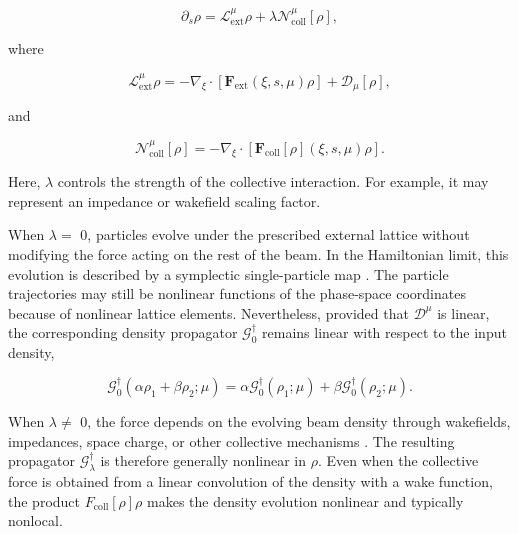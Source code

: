 \begin{equation}
\label{eq:87}
\partial_s\rho=\mathcal L_{\mathrm{ext}}^{\mu}\rho+\lambda\mathcal N_{\mathrm{coll}}^{\mu}[\rho],
\end{equation}

where

\begin{equation}
\label{eq:88}
\mathcal L_{\mathrm{ext}}^{\mu}\rho=-\nabla_{\xi}\cdot[\mathbf F_{\mathrm{ext}}(\xi,s,\mu)\rho]+\mathcal D_{\mu}[\rho],
\end{equation}

and

\begin{equation}
\label{eq:89}
\mathcal N_{\mathrm{coll}}^{\mu}[\rho]=-\nabla_{\xi}\cdot[\mathbf F_{\mathrm{coll}}[\rho](\xi,s,\mu)\rho].
\end{equation}

Here, \(\lambda\) controls the strength of the collective interaction. For example, it may represent an impedance or wakefield scaling factor.

When \(\lambda =\) 0, particles evolve under the prescribed external lattice without modifying the force acting on the rest of the beam. In the Hamiltonian limit, this evolution is described by a symplectic single-particle map \cite{huang2024symplectic}. The particle trajectories may still be nonlinear functions of the phase-space coordinates because of nonlinear lattice elements. Nevertheless, provided that \(\mathcal{D}^{\mu}\) is linear, the corresponding density propagator \(\mathcal{G}_{0}^{\dagger}\) remains linear with respect to the input density,

\begin{equation}
\label{eq:90}
\mathcal G_0^{\dagger}(\alpha\rho_1+\beta\rho_2;\mu)=\alpha\mathcal G_0^{\dagger}(\rho_1;\mu)+\beta\mathcal G_0^{\dagger}(\rho_2;\mu).
\end{equation}

When \(\lambda \not =\) 0, the force depends on the evolving beam density through wakefields, impedances, space charge, or other collective mechanisms \cite{metral2021wake,ghribi2026collective}. The resulting propagator \(\mathcal{G}_{\lambda}^{\dagger}\) is therefore generally nonlinear in \(\rho .\) Even when the collective force is obtained from a linear convolution of the density with a wake function, the product \(F_{\mathrm{coll}} [ \rho ] \rho\) makes the density evolution nonlinear and typically nonlocal.

